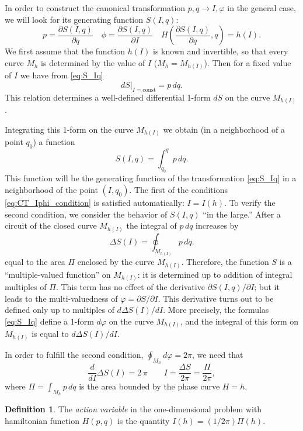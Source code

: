 \documentclass[leqno]{report}
\numberwithin{equation}{section}
\theoremstyle{plain}
\theoremstyle{definition}
\newtheorem*{defn*}{Definition}
\theoremstyle{remark}
\theoremstyle{smallcap}
\numberwithin{prob}{section}
\begin{document}
In order to construct the canonical transformation $p, q \to I, \varphi$
in the general case, we will look for its generating function $S(I, q)$:
\begin{equation}
  p = \frac{ \partial S(I, q) } { \partial q }
  \quad
  \phi = \frac{ \partial S(I, q) } { \partial I }
  \quad
  H\left(
    \frac{ \partial S(I, q) } { \partial q },
    q
  \right)
  = h(I).
  \label{eq:S_Iq}
\end{equation}
We first assume that the function $h(I)$ is known
and invertible, so that every curve $M_h$ is determined
by the value of $I$ ($M_h = M_{h(I)}$).
%
Then for a fixed value of $I$
we have from \eqref{eq:S_Iq}
$$
dS\big|_{I = \mathrm{const}} = p \, dq.
$$
This relation determines a well-defined differential 1-form $dS$
on the curve $M_{h(I)}$.

Integrating this 1-form on the curve $M_{h(I)}$
we obtain (in a neighborhood of a point $q_0$)
a function
$$
S(I, q) = \int_{q_0}^q p \, dq.
$$
This function will be the generating function
of the transformation \eqref{eq:S_Iq}
in a neighborhood of the point $(I, q_0)$.
%
The first of the conditions \eqref{eq:CT_Iphi_condition}
is satisfied automatically: $I = I(h)$.
%
To verify the second condition,
we consider the behavior of $S(I, q)$ ``in the large.''
%
After a circuit of the closed curve $M_{h(I)}$
the integral of $p\, dq$ increases by
$$
\Delta S(I) = \oint_{M_{h(I)}} p \, dq.
$$
equal to the area $\Pi$ enclosed by the curve $M_{h(I)}$.
%
Therefore, the function $S$ is a ``multiple-valued function''
on $M_{h(I)}$:
it is determined up to addition of integral multiples of $\Pi$.
%
This term has no effect of the derivative
$\partial S(I, q)/\partial I$;
but it leads to the multi-valuedness of $\varphi = \partial S/\partial I$.
%
This derivative turns out to be defined only up to multiples of
$d \Delta S(I) / dI$.
%
More precisely,
the formulas \eqref{eq:S_Iq}
define a 1-form $d\varphi$ on the curve $M_{h(I)}$,
and the integral of this form on $M_{h(I)}$
is equal to $d\Delta S(I)/dI$.

In order to fulfill the second condition,
$\oint_{M_{h}} d\varphi = 2 \pi$,
we need that
$$
\frac{d}{dI} \Delta S(I) = 2 \, \pi
\qquad
I = \frac{ \Delta S  }{ 2 \pi }
= \frac{ \Pi } { 2 \pi },
$$
where
$\Pi = \int_{M_h} p \, dq$
is the area bounded by the phase curve $H = h$.

\begin{defn*}
  The \emph{action variable} in the one-dimensional problem
  with hamiltonian function $H(p, q)$
  is the quantity $I(h) = (1/2\pi) \Pi(h)$.
\end{defn*}
\end{document}
